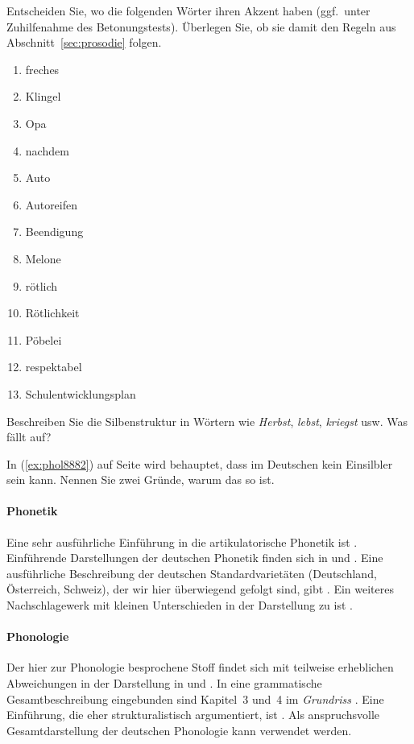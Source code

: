 \Uebung \label{u45} Entscheiden Sie, wo die folgenden Wörter ihren Akzent haben (ggf.\ unter Zuhilfenahme des Betonungstests).
Überlegen Sie, ob sie damit den Regeln aus Abschnitt~\ref{sec:prosodie} folgen.

\begin{enumerate}\Lf
  \item freches
  \item Klingel
  \item Opa
  \item nachdem
  \item Auto
  \item Autoreifen
  \item Beendigung
  \item Melone
  \item rötlich
  \item Rötlichkeit
  \item Pöbelei
  \item respektabel
  \item Schulentwicklungsplan
\end{enumerate}

\Uebung[\tristar] \label{u46} Beschreiben Sie die Silbenstruktur in Wörtern wie \textit{Herbst}, \textit{lebst}, \textit{kriegst} usw.
Was fällt auf?

\Uebung[\tristar] \label{u47} In (\ref{ex:phol8882}) auf Seite \pageref{ex:phol8882} wird behauptet, dass \textipa{[s5]} im Deutschen kein Einsilbler sein kann.
Nennen Sie zwei Gründe, warum das so ist.

\WeitereLiteratur

\paragraph*{Phonetik}

Eine sehr ausführliche Einführung in die artikulatorische Phonetik ist \citet{Laver94}.
Einführende Darstellungen der deutschen Phonetik finden sich \zB in \citet{RRKWS09} und \citet{Wiese10}.
Eine ausführliche Beschreibung der deutschen Standardvarietäten (Deutschland, Österreich, Schweiz), der wir hier überwiegend gefolgt sind, gibt \citet{Krech-ea2009}.
Ein weiteres Nachschlagewerk mit kleinen Unterschieden in der Darstellung zu \citealp{Krech-ea2009} ist \citet{Mangold06}.

\paragraph*{Phonologie}

\label{abs:pholliteratur}

Der hier zur Phonologie besprochene Stoff findet sich mit teilweise erheblichen Abweichungen in der Darstellung \zB in \citet{Hall00} und \citet{Wiese10}.
In eine grammatische Gesamtbeschreibung eingebunden sind Kapitel~3 und~4 im \textit{Grundriss} \citep{Eisenberg1}.
Eine Einführung, die eher strukturalistisch argumentiert, ist \citet{Ternes2012}.
Als anspruchsvolle Gesamtdarstellung der deutschen Phonologie kann \citet{Wiese00} verwendet werden.
